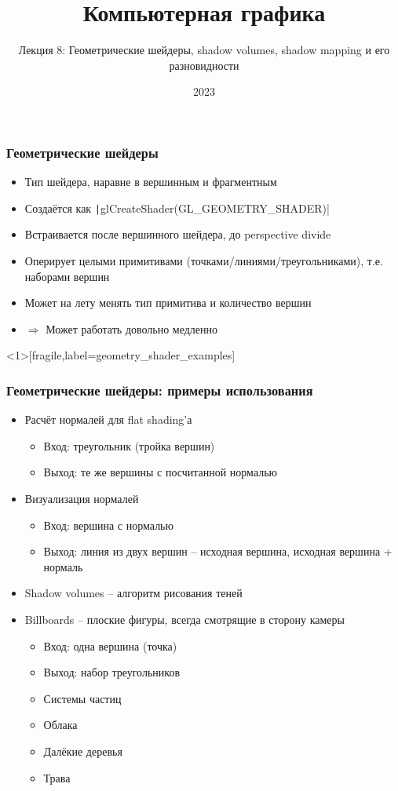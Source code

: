 \documentclass[10pt]{beamer}
\title{Компьютерная графика}
\subtitle{Лекция 8: Геометрические шейдеры, shadow volumes, shadow mapping и его разновидности}
\date{2023}
\begin{document}

\frame{\titlepage}

\begin{frame}[fragile]
\frametitle{Геометрические шейдеры}
\begin{itemize}
\item Тип шейдера, наравне в вершинным и фрагментным
\pause
\item Создаётся как \texttt|glCreateShader(GL_GEOMETRY_SHADER)|
\pause
\item Встраивается после вершинного шейдера, до perspective divide
\pause
\item Оперирует целыми примитивами (точками/линиями/треугольниками), т.е. наборами вершин
\pause
\item Может на лету менять тип примитива и количество вершин
\pause
\item \begin{math}\Longrightarrow\end{math} Может работать довольно медленно
\end{itemize}
\end{frame}

\begin{frame}<1>[fragile,label=geometry_shader_examples]
\frametitle{Геометрические шейдеры: примеры использования}
\fontsize{10pt}{10pt}
\begin{itemize}
\item Расчёт нормалей для flat shading'а
\pause
\begin{itemize}
\item Вход: треугольник (тройка вершин)
\item Выход: те же вершины с посчитанной нормалью
\end{itemize}
\pause
\item Визуализация нормалей
\pause
\begin{itemize}
\item Вход: вершина с нормалью
\item Выход: линия из двух вершин -- исходная вершина, исходная вершина + нормаль
\end{itemize}
\pause
\item Shadow volumes -- алгоритм рисования теней
\pause
\item Billboards -- плоские фигуры, всегда смотрящие в сторону камеры
\pause
\begin{itemize}
\item Вход: одна вершина (точка)
\item Выход: набор треугольников
\pause
\item Системы частиц
\pause
\item Облака
\pause
\item Далёкие деревья
\pause
\item Трава
\end{itemize}
\end{itemize}
\end{frame}
\end{document}
